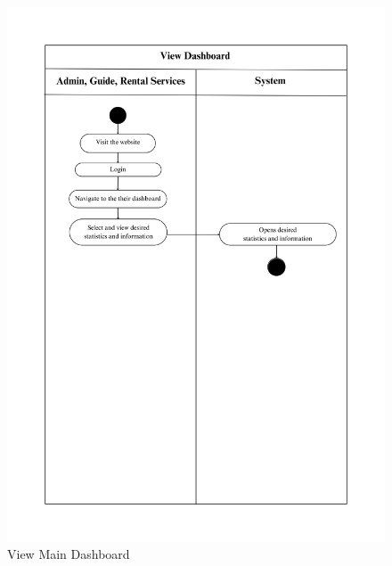 \begin{figure}[h]
    \centering
    \includegraphics[width=1\textwidth]{Images/Activity Diagrams/13 View Dashboard.png}
    \caption{View Main Dashboard}
    \label{fig:activity-main-dashboard}
\end{figure}

